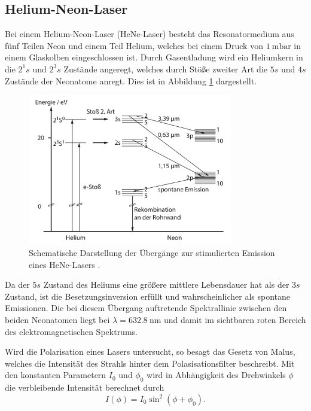 \subsection{Helium-Neon-Laser}
\label{sec:Helium-Neon-Laser}
Bei einem Helium-Neon-Laser (HeNe-Laser)
besteht das Resonatormedium aus fünf Teilen Neon und einem Teil Helium, welches
bei einem Druck von $\SI{1}{\milli\bar}$ in einem Glaskolben eingeschlossen ist.
Durch Gasentladung wird ein Heliumkern in die $2^1s$ und $2^3s$ Zustände angeregt,
welches durch Stöße zweiter Art die $5s$ und $4s$ Zustände der Neonatome anregt.
Dies ist in Abbildung \ref{fig:HeNe} dargestellt.
\begin{figure}
  \centering
  \includegraphics[width=0.8\textwidth]{content/HeNe.pdf}
  \caption{Schematische Darstellung der Übergänge zur stimulierten
  Emission eines HeNe-Lasers \cite[68]{eichler}.}
  \label{fig:HeNe}
\end{figure}

Da der $5s$ Zustand des Heliums eine größere mittlere Lebensdauer hat als der
$3s$ Zustand, ist die Besetzungsinversion erfüllt und wahrscheinlicher als
spontane Emissionen. Die bei diesem Übergang auftretende Spektrallinie zwischen
den beiden Neonatomen liegt bei $\lambda = \SI{632.8}{\nano\metre}$ und damit
im sichtbaren roten Bereich des elektromagnetischen Spektrums.

Wird die Polarisation eines Lasers untersucht, so besagt das Gesetz von Malus,
welches die Intensität des Strahls hinter dem Polasisationsfilter beschreibt. Mit
den konstanten Parametern $I_0$ und $\phi_0$ wird in Abhängigkeit des Drehwinkels
$\phi$ die verbleibende Intensität berechnet durch
\begin{equation}
  I(\phi) = I_0\sin^2(\phi+\phi_0).
  \label{eqn:pol}
\end{equation}

